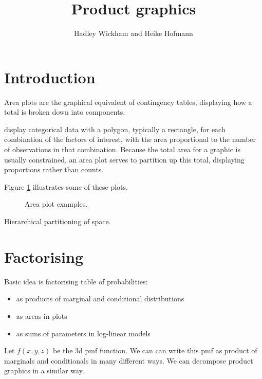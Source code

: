\documentclass[letterpaper,oneside]{scrartcl}
\title{Product graphics}
\author{Hadley Wickham and Heike Hofmann}
\begin{document}
\maketitle
  
\section{Introduction}


%
% 

Area plots are the graphical equivalent of contingency tables, displaying how a total is broken down into components.  

display categorical data with a polygon, typically a rectangle, for each combination of the factors of interest, with the area proportional to the number of observations in that combination.  Because the total area for a graphic is usually constrained, an area plot serves to partition up this total, displaying proportions rather than counts.

Figure \ref{fig:cat-examples} illustrates some of these plots.

\begin{figure}[htbp]
  \begin{center}
  \end{center}
  \caption{Area plot examples.}
  \label{fig:cat-examples}
\end{figure}

Hierarchical partitioning of space.

\section{Factorising}

Basic idea is factorising table of probabilities:

\begin{itemize}
  \item as products of marginal and conditional distributions
  \item as areas in plots
  \item as sums of parameters in log-linear models
\end{itemize}

Let $f(x, y, z)$ be the 3d pmf function. We can can write this pmf as product of marginals and conditionals in many different ways.  We can decompose product graphics in a similar way.
\end{document}
